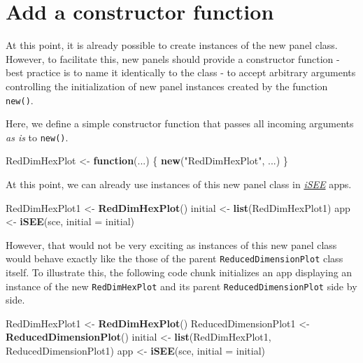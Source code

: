 \documentclass[
]{book}
\newenvironment{Shaded}{\begin{snugshade}}{\end{snugshade}}
\newcommand{\ControlFlowTok}[1]{\textcolor[rgb]{0.13,0.29,0.53}{\textbf{#1}}}
\newcommand{\DataTypeTok}[1]{\textcolor[rgb]{0.13,0.29,0.53}{#1}}
\newcommand{\KeywordTok}[1]{\textcolor[rgb]{0.13,0.29,0.53}{\textbf{#1}}}
\newcommand{\NormalTok}[1]{#1}
\newcommand{\StringTok}[1]{\textcolor[rgb]{0.31,0.60,0.02}{#1}}
\begin{document}
\hypertarget{add-a-constructor-function}{%
\section{Add a constructor function}\label{add-a-constructor-function}}

At this point, it is already possible to create instances of the new panel class.
However, to facilitate this, new panels should provide a constructor function - best practice is to name it identically to the class - to accept arbitrary arguments controlling the initialization of new panel instances created by the function \texttt{new()}.

Here, we define a simple constructor function that passes all incoming arguments \emph{as is} to \texttt{new()}.

\begin{Shaded}
\begin{Highlighting}[]
\NormalTok{RedDimHexPlot <-}\StringTok{ }\ControlFlowTok{function}\NormalTok{(...) \{}
    \KeywordTok{new}\NormalTok{(}\StringTok{"RedDimHexPlot"}\NormalTok{, ...)}
\NormalTok{\}}
\end{Highlighting}
\end{Shaded}

At this point, we can already use instances of this new panel class in \emph{\href{https://bioconductor.org/packages/3.11/iSEE}{iSEE}} apps.

\begin{Shaded}
\begin{Highlighting}[]
\NormalTok{RedDimHexPlot1 <-}\StringTok{ }\KeywordTok{RedDimHexPlot}\NormalTok{()}
\NormalTok{initial <-}\StringTok{ }\KeywordTok{list}\NormalTok{(RedDimHexPlot1)}
\NormalTok{app <-}\StringTok{ }\KeywordTok{iSEE}\NormalTok{(sce, }\DataTypeTok{initial =}\NormalTok{ initial)}
\end{Highlighting}
\end{Shaded}

However, that would not be very exciting as instances of this new panel class would behave exactly like the those of the parent \texttt{ReducedDimensionPlot} class itself.
To illustrate this, the following code chunk initializes an app displaying an instance of the new \texttt{RedDimHexPlot} and its parent \texttt{ReducedDimensionPlot} side by side.

\begin{Shaded}
\begin{Highlighting}[]
\NormalTok{RedDimHexPlot1 <-}\StringTok{ }\KeywordTok{RedDimHexPlot}\NormalTok{()}
\NormalTok{ReducedDimensionPlot1 <-}\StringTok{ }\KeywordTok{ReducedDimensionPlot}\NormalTok{()}
\NormalTok{initial <-}\StringTok{ }\KeywordTok{list}\NormalTok{(RedDimHexPlot1, ReducedDimensionPlot1)}
\NormalTok{app <-}\StringTok{ }\KeywordTok{iSEE}\NormalTok{(sce, }\DataTypeTok{initial =}\NormalTok{ initial)}
\end{Highlighting}
\end{Shaded}
\end{document}
